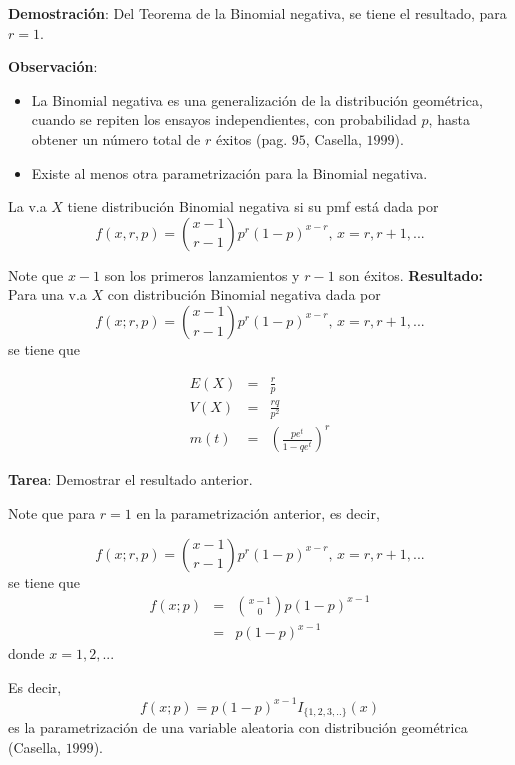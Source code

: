 \begin{i}
\textbf{Demostración}: Del Teorema de la Binomial negativa, se tiene el
resultado, para $r=1$.

\textbf{Observación}:
\begin{itemize}
\item La Binomial negativa es una generalización de la distribución geométrica, cuando se repiten los ensayos independientes, con probabilidad $p$, hasta obtener un número total de $r$ éxitos (pag. $95$, Casella, $1999$).

\item Existe al menos otra parametrización para la Binomial negativa.
\end{itemize}


\begin{definition}
La v.a $X$ tiene distribución Binomial negativa si su pmf está dada por 
\begin{equation*}
f(x,r,p)=\binom{x-1}{r-1}p^{r}(1-p)^{x-r}\text{, \ \ }x=r,r+1,...
\end{equation*}
\end{definition}

Note que $x-1$ son los primeros lanzamientos y $r-1$ son éxitos.
\textbf{Resultado:} Para una v.a $X$ con distribución Binomial negativa
dada por 
\begin{equation*}
f(x;r,p)=\binom{x-1}{r-1}p^{r}(1-p)^{x-r}\text{, \ \ }x=r,r+1,...
\end{equation*}%
se tiene que

\begin{eqnarray*}
E(X) &=&\frac{r}{p} \\
V(X) &=&\frac{rq}{p^{2}} \\
m(t) &=&\left( \frac{pe^{t}}{1-qe^{t}}\right) ^{r}
\end{eqnarray*}


\textbf{Tarea}: Demostrar el resultado anterior.

Note que para $r=1$ en la parametrización anterior, es decir,

\begin{equation*}
f(x;r,p)=\binom{x-1}{r-1}p^{r}(1-p)^{x-r}\text{, \ \ }x=r,r+1,...
\end{equation*}
se tiene que\ 
\begin{eqnarray*}
f(x;p) &=&\binom{x-1}{0}p(1-p)^{x-1} \\
&=&p(1-p)^{x-1}
\end{eqnarray*}
donde $x=1,2,...$

Es decir,
\begin{equation*}
f(x;p)=p(1-p)^{x-1}I_{\{1,2,3,..\}}(x)
\end{equation*}
es la parametrización de una variable aleatoria con distribución geométrica (Casella, $1999$).



\end{i}
